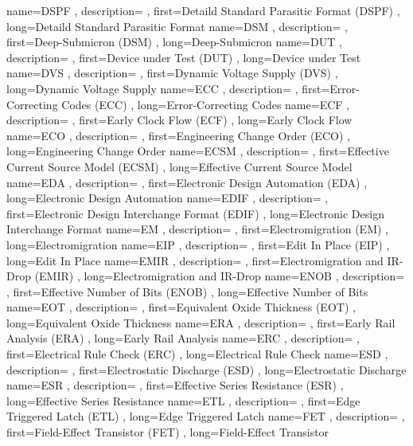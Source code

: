 { name={DSPF}
, description={}
, first={Detaild Standard Parasitic Format (DSPF)}
, long={Detaild Standard Parasitic Format}
}
{ name={DSM}
, description={}
, first={Deep-Submicron (DSM)}
, long={Deep-Submicron}
}
{ name={DUT}
, description={}
, first={Device under Test (DUT)}
, long={Device under Test}
}
{ name={DVS}
, description={}
, first={Dynamic Voltage Supply (DVS)}
, long={Dynamic Voltage Supply}
}
{ name={ECC}
, description={}
, first={Error-Correcting Codes (ECC)}
, long={Error-Correcting Codes}
}
{ name={ECF}
, description={}
, first={Early Clock Flow (ECF)}
, long={Early Clock Flow}
}
{ name={ECO}
, description={}
, first={Engineering Change Order (ECO)}
, long={Engineering Change Order}
}
{ name={ECSM}
, description={}
, first={Effective Current Source Model (ECSM)}
, long={Effective Current Source Model}
}
{ name={EDA}
, description={}
, first={Electronic Design Automation (EDA)}
, long={Electronic Design Automation}
}
{ name={EDIF}
, description={}
, first={Electronic Design Interchange Format (EDIF)}
, long={Electronic Design Interchange Format}
}
{ name={EM}
, description={}
, first={Electromigration (EM)}
, long={Electromigration}
}
{ name={EIP}
, description={}
, first={Edit In Place (EIP)}
, long={Edit In Place}
}
{ name={EMIR}
, description={}
, first={Electromigration and IR-Drop (EMIR)}
, long={Electromigration and IR-Drop}
}
{ name={ENOB}
, description={}
, first={Effective Number of Bits (ENOB)}
, long={Effective Number of Bits}
}
{ name={EOT}
, description={}
, first={Equivalent Oxide Thickness (EOT)}
, long={Equivalent Oxide Thickness}
}
{ name={ERA}
, description={}
, first={Early Rail Analysis (ERA)}
, long={Early Rail Analysis}
}
{ name={ERC}
, description={}
, first={Electrical Rule Check (ERC)}
, long={Electrical Rule Check}
}
{ name={ESD}
, description={}
, first={Electrostatic Discharge (ESD)}
, long={Electrostatic Discharge}
}
{ name={ESR}
, description={}
, first={Effective Series Resistance (ESR)}
, long={Effective Series Resistance}
}
{ name={ETL}
, description={}
, first={Edge Triggered Latch (ETL)}
, long={Edge Triggered Latch}
}
{ name={FET}
, description={}
, first={Field-Effect Transistor (FET)}
, long={Field-Effect Transistor}
}
